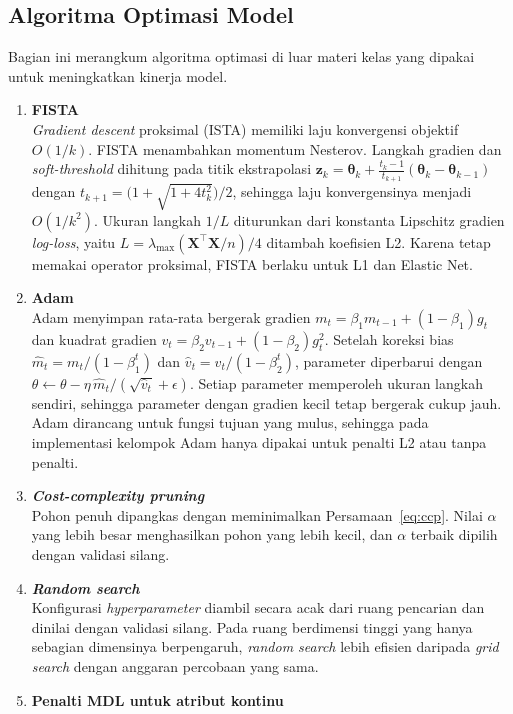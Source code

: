 \subsection{Algoritma Optimasi Model}
Bagian ini merangkum algoritma optimasi di luar materi kelas yang dipakai untuk meningkatkan kinerja model.
\begin{enumerate}
    \setlength{\itemsep}{0pt}
    \item \textbf{FISTA}\\
    \textit{Gradient descent} proksimal (ISTA) memiliki laju konvergensi objektif $O(1/k)$. FISTA menambahkan momentum Nesterov. Langkah gradien dan \textit{soft-threshold} dihitung pada titik ekstrapolasi $\mathbf{z}_k=\boldsymbol{\theta}_k+\frac{t_k-1}{t_{k+1}}(\boldsymbol{\theta}_k-\boldsymbol{\theta}_{k-1})$ dengan $t_{k+1}=\bigl(1+\sqrt{1+4t_k^2}\bigr)/2$, sehingga laju konvergensinya menjadi $O(1/k^2)$. Ukuran langkah $1/L$ diturunkan dari konstanta Lipschitz gradien \textit{log-loss}, yaitu $L=\lambda_{\max}(\mathbf{X}^\top\mathbf{X}/n)/4$ ditambah koefisien L2. Karena tetap memakai operator proksimal, FISTA berlaku untuk L1 dan Elastic Net.
    \item \textbf{Adam}\\
    Adam menyimpan rata-rata bergerak gradien $m_t=\beta_1 m_{t-1}+(1-\beta_1)g_t$ dan kuadrat gradien $v_t=\beta_2 v_{t-1}+(1-\beta_2)g_t^2$. Setelah koreksi bias $\hat{m}_t=m_t/(1-\beta_1^t)$ dan $\hat{v}_t=v_t/(1-\beta_2^t)$, parameter diperbarui dengan $\theta\leftarrow\theta-\eta\,\hat{m}_t/(\sqrt{\hat{v}_t}+\epsilon)$. Setiap parameter memperoleh ukuran langkah sendiri, sehingga parameter dengan gradien kecil tetap bergerak cukup jauh. Adam dirancang untuk fungsi tujuan yang mulus, sehingga pada implementasi kelompok Adam hanya dipakai untuk penalti L2 atau tanpa penalti.
    \item \textbf{\textit{Cost-complexity pruning}}\\
    Pohon penuh dipangkas dengan meminimalkan Persamaan~\ref{eq:ccp}. Nilai $\alpha$ yang lebih besar menghasilkan pohon yang lebih kecil, dan $\alpha$ terbaik dipilih dengan validasi silang.
    \item \textbf{\textit{Random search}}\\
    Konfigurasi \textit{hyperparameter} diambil secara acak dari ruang pencarian dan dinilai dengan validasi silang. Pada ruang berdimensi tinggi yang hanya sebagian dimensinya berpengaruh, \textit{random search} lebih efisien daripada \textit{grid search} dengan anggaran percobaan yang sama.
    \item \textbf{Penalti MDL untuk atribut kontinu}\\

\end{enumerate}
